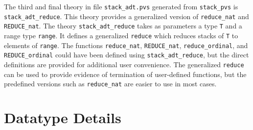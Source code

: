 The third and final theory in file \texttt{stack\_adt.pvs} generated from
\texttt{stack\_pvs} is \texttt{stack\_adt\_reduce}.  This theory provides
a generalized version of \texttt{reduce\_nat} and \texttt{REDUCE\_nat}.
The theory \texttt{stack\_adt\_reduce} takes as parameters a type
\texttt{T} and a range type \texttt{range}.  It defines a generalized
\texttt{reduce} which reduces stacks of \texttt{T} to elements of
\texttt{range}.  The functions \texttt{reduce\_nat}, \texttt{REDUCE\_nat},
\texttt{reduce\_ordinal}, and \texttt{REDUCE\_ordinal} could have been
defined using \texttt{stack\_adt\_reduce}, but the direct definitions are
provided for additional user convenience.  The generalized \texttt{reduce}
can be used to provide evidence of termination of user-defined functions,
but the predefined versions such as \texttt{reduce\_nat} are easier to use
in most cases.

\section{Datatype Details}

